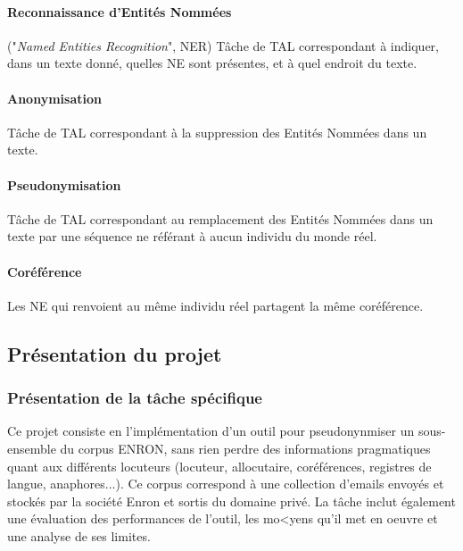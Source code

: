 \documentclass{article}
\begin{document}
\paragraph{Reconnaissance d'Entités Nommées} ("\textit{Named Entities Recognition}", NER) Tâche de TAL correspondant à indiquer, dans un texte donné, quelles NE sont présentes, et à quel endroit du texte.
\paragraph{Anonymisation} Tâche de TAL correspondant à la suppression des Entités Nommées dans un texte.
\paragraph{Pseudonymisation} Tâche de TAL correspondant au remplacement des Entités Nommées dans un texte par une séquence ne référant à aucun individu du monde réel.
\paragraph{Coréférence} Les NE qui renvoient au même individu réel partagent la même coréférence. 

\subsection{Présentation du projet}
\subsubsection{Présentation de la tâche spécifique}
\par
Ce projet consiste en l'implémentation d'un outil pour pseudonynmiser un sous-ensemble du corpus ENRON, sans rien perdre des informations pragmatiques quant aux différents locuteurs (locuteur, allocutaire, coréférences, registres de langue, anaphores...).
Ce corpus correspond à une collection d'emails envoyés et stockés par la société Enron et sortis du domaine privé.
La tâche inclut également une évaluation des performances de l'outil, les mo<yens qu'il met en oeuvre et une analyse de ses limites.
\end{document}
